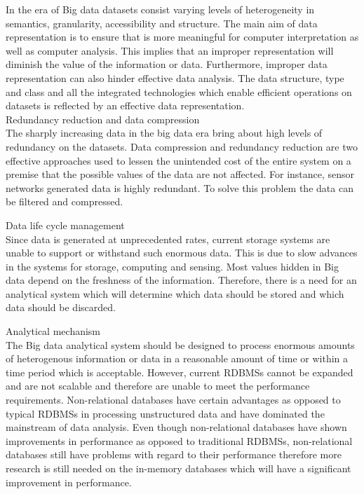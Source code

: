 \documentclass[conference]{IEEEtran}
\begin{document}
In the era of Big data datasets consist varying levels of heterogeneity in semantics, granularity, accessibility and structure. The main aim of data representation is to ensure that is more meaningful for computer interpretation as well as computer analysis. This implies that an improper representation will diminish the value of the information or data. Furthermore, improper data representation can also hinder effective data analysis. The data structure, type and class and all the integrated technologies which enable efficient operations on datasets is reflected by an effective data representation. \\

Redundancy reduction and data compression \\

The sharply increasing data in the big data era bring about high levels of redundancy on the datasets. Data compression and redundancy reduction are two effective approaches used to lessen the unintended cost of the entire system on a premise that the possible values of the data are not affected. For instance, sensor networks generated data is highly redundant. To solve this problem the data can be filtered and compressed.

Data life cycle management \\

Since data is generated at unprecedented rates, current storage systems are unable to support or withstand such enormous data. This is due to slow advances in the systems for storage, computing and sensing. Most values hidden in Big data depend on the freshness of the information. Therefore, there is a need for an analytical system which will determine which data should be stored and which data should be discarded.

Analytical mechanism \\

The Big data analytical system should be designed to process enormous amounts of heterogenous information or data in a reasonable amount of time or within a time period which is acceptable. However, current RDBMSs cannot be expanded and are not scalable and therefore are unable to meet the performance requirements. Non-relational databases have certain advantages as opposed to typical RDBMSs in processing unstructured data and have dominated the mainstream of data analysis. Even though non-relational databases have shown improvements in performance as opposed to traditional RDBMSs, non-relational databases still have problems with regard to their performance therefore more research is still needed on the in-memory databases which will have a significant improvement in performance.
\end{document}
